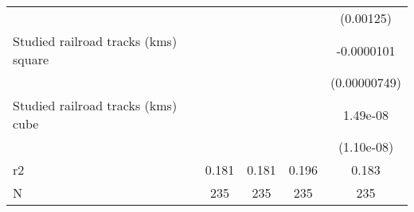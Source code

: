 {\begin{tabular}{l*{4}{c}}
                    &                     &                     &                     &   (0.00125)         \\
[1em]
Studied railroad tracks (kms) square&                     &                     &                     &  -0.0000101         \\
                    &                     &                     &                     &(0.00000749)         \\
[1em]
Studied railroad tracks (kms) cube&                     &                     &                     &    1.49e-08         \\
                    &                     &                     &                     &  (1.10e-08)         \\
\hline
r2                  &       0.181         &       0.181         &       0.196         &       0.183         \\
N                   &         235         &         235         &         235         &         235         \\
\hline\hline
\end{tabular}
}
